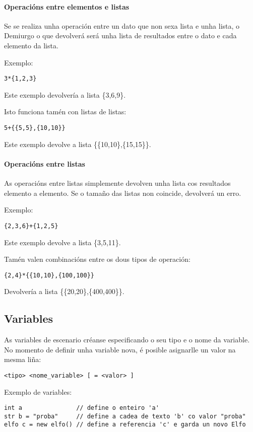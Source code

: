 \paragraph{Operacións entre elementos e listas}
Se se realiza unha operación entre un dato que non sexa lista e unha lista, o
Demiurgo o que devolverá será unha lista de resultados entre o dato e cada
elemento da lista.
\par Exemplo:
\begin{lstlisting}
3*{1,2,3}
\end{lstlisting}
\par Este exemplo devolvería a lista \{3,6,9\}.
\par Isto funciona tamén con listas de listas:
\begin{lstlisting}
5+{{5,5},{10,10}}
\end{lstlisting}
\par Este exemplo devolve a lista \{\{10,10\},\{15,15\}\}.
\paragraph{Operacións entre listas}
As operacións entre listas simplemente devolven unha lista cos resultados
elemento a elemento. Se o tamaño das listas non coincide, devolverá un erro.
\par Exemplo:
\begin{lstlisting}
{2,3,6}+{1,2,5}
\end{lstlisting}
\par Este exemplo devolve a lista \{3,5,11\}.
\par Tamén valen combinacións entre os dous tipos de operación:
\begin{lstlisting}
{2,4}*{{10,10},{100,100}}
\end{lstlisting}
\par Devolvería a lista \{\{20,20\},\{400,400\}\}.

\subsection{Variables}
As variables de escenario créanse especificando o seu tipo e o nome da variable.
No momento de definir unha variable nova, é posible asignarlle un valor na mesma
liña:
\begin{lstlisting}
<tipo> <nome_variable> [ = <valor> ]
\end{lstlisting}
\par Exemplo de variables:
\begin{lstlisting}
int a               // define o enteiro 'a'
str b = "proba"     // define a cadea de texto 'b' co valor "proba"
elfo c = new elfo() // define a referencia 'c' e garda un novo Elfo 
\end{lstlisting}

